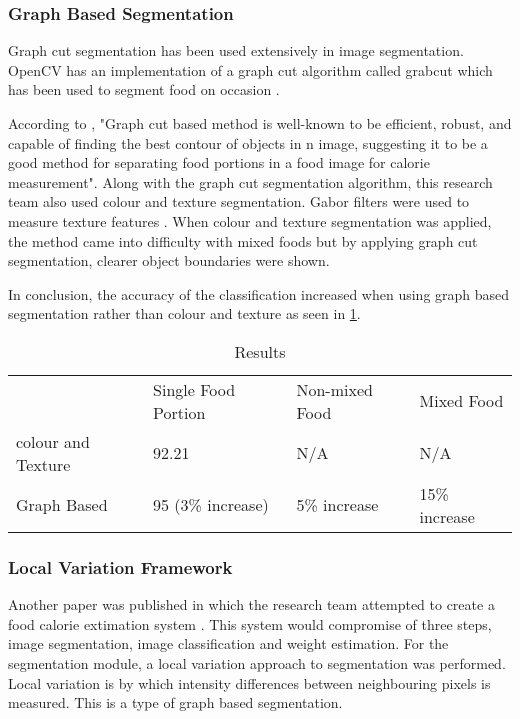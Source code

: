 \subsubsection*{Graph Based Segmentation}
Graph cut segmentation has been used extensively  in image segmentation. OpenCV
has an implementation of a graph cut algorithm called grabcut which has been
used to segment food on occasion \parencite{graphCut}. 

According to \parencite{graphCut}, "Graph cut based method is well-known to be
efficient, robust, and capable of finding the best contour of objects in n
image, suggesting it to be a good method for separating food portions in a food
image for calorie measurement". Along with the graph cut segmentation algorithm,
this research team also used colour and texture segmentation. Gabor filters were
used to measure texture features \parencite{graphCut}. When colour and texture
segmentation was applied, the method came into difficulty with mixed foods but
by applying graph cut segmentation, clearer object boundaries were shown.

In conclusion, the accuracy of the classification increased when using graph
based segmentation rather than colour and texture as seen in \ref{graphCT}.

\begin{table}[]
	\centering
	\caption{Results}
	\label{graphCT}
	\begin{tabular}{llll}
		                  & Single Food Portion & Non-mixed Food & Mixed Food
						  \\
						  colour and Texture & 92.21               & N/A
						  & N/A           \\
						  Graph Based       & 95 (3\% increase)   & 5\% increase
						  & 15\% increase
	\end{tabular}
\end{table}

\subsubsection*{Local Variation Framework}
Another paper was published in which the research team attempted to create a
food calorie extimation system \parencite{foodImageAnalysis}. This system would
compromise of three steps, image segmentation, image classification and weight
estimation. For the segmentation module, a local variation approach to
segmentation was performed. Local variation is by which intensity differences
between neighbouring pixels is measured. This is a type of graph based
segmentation.


